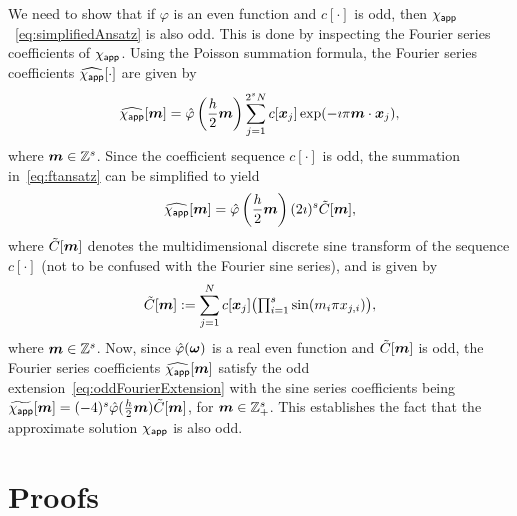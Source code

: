 \label{app:1}
We need to show that if $\varphi$ is an even function and $c[\cdot]$ is odd, then $\chi_{\mathsf{app}}$~\eqref{eq:simplifiedAnsatz} is also odd. 
This is done by inspecting the Fourier series coefficients of $\chi_{\mathsf{app}}$. 
Using the Poisson summation formula, the Fourier series coefficients $\widehat{\chi_{\mathsf{app}}}[\cdot]$ are given by
\begin{equation}
  \wft{\appf{\chi}}[\vect{m}] = \ft{\varphi}\left(\frac{h}{2}\vect{m}\right) 
  \sum_{j=1}^{2^sN} c[\vect{x}_j]
  \exp(-\imath \pi \vect{m} \cdot \vect{x}_j),
\label{eq:ftansatz}
\end{equation}
where $\boldsymbol{m} \in \mathbb{Z}^s$.
Since the coefficient sequence $c[\cdot]$ is odd, the summation in~\eqref{eq:ftansatz} can be simplified to yield
\begin{equation}
  \widehat{\chi_{\mathsf{app}}}[\boldsymbol{m}] = \hat{\varphi}\left(\frac{h}{2}\boldsymbol{m}\right)(2\imath)^s
  \tilde{C}[\boldsymbol{m}],
\end{equation}
where $\tilde{C}[\boldsymbol{m}]$ denotes the multidimensional discrete sine transform of the sequence $c[\cdot]$ (not to be confused with the Fourier sine series), and is given by
\begin{equation}
  \st{C}[\vect{m}] := \sum_{j=1}^N c[\vect{x}_j]
  \bigl( 
  \textstyle\prod_{i=1}^s
  \sin(m_i \pi x_{j,i})
  \bigr),
\label{eq:MDST}
\end{equation}
where $\boldsymbol{m} \in \mathbb{Z}^s$.
Now, since $\hat{\varphi}(\boldsymbol{\omega})$ is a real even function and $\tilde{C}[\boldsymbol{m}]$ is odd, the Fourier series coefficients $\widehat{\chi_{\mathsf{app}}}[\boldsymbol{m}]$ satisfy the odd extension~\eqref{eq:oddFourierExtension} with the sine series coefficients being $\widetilde{\chi_{\mathsf{app}}}[\boldsymbol{m}] = (-4)^s \hat{\varphi}(\frac{h}{2}\boldsymbol{m})\tilde{C}[\boldsymbol{m}]$, for $\boldsymbol{m} \in \mathbb{Z}^s_+$. This establishes the fact that the approximate solution $\chi_{\mathsf{app}}$ is also odd.

\section{Proofs}
\label{app:proofs}

